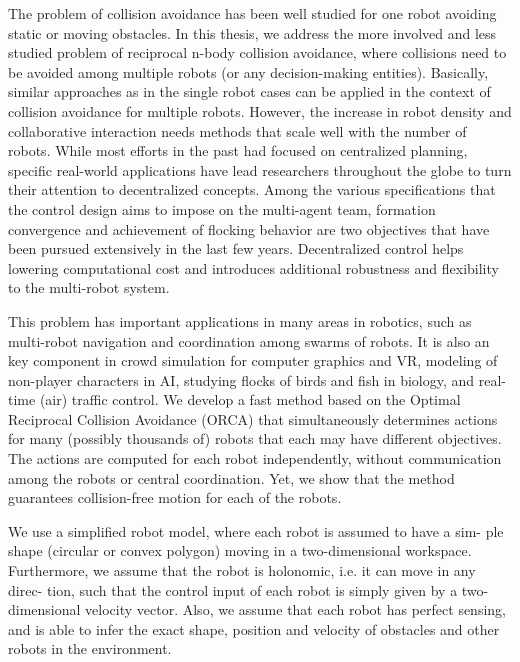 \documentclass[12pt]{report}
\begin{document}
The problem of collision avoidance has been well studied for one robot avoiding static or moving obstacles. In this thesis, we address the more involved and less studied problem of reciprocal n-body collision avoidance, where collisions need to be avoided among multiple robots (or any decision-making entities). Basically, similar approaches as
in the single robot cases can be applied in the context of collision avoidance for multiple robots. However, the increase in robot density and collaborative interaction
needs methods that scale well with the number of robots. While  most  efforts  in  the  past  had  focused  on  centralized  planning, specific real-world applications have  lead researchers throughout the globe to turn their attention to decentralized concepts. Among  the  various  specifications  that  the  control  design  aims  to  impose  on  the  multi-agent  team,  formation convergence and achievement of flocking behavior are two objectives that have been pursued extensively in the last few years. Decentralized control helps lowering computational cost and introduces additional robustness and flexibility to the multi-robot system. 

This problem has important applications in many areas in robotics, such as multi-robot navigation and coordination among swarms of robots. It is also an key component in crowd simulation for computer graphics and VR, modeling of non-player characters in AI, studying flocks of birds and fish in biology, and real-time (air) traffic control. We develop a fast method based on the Optimal Reciprocal Collision Avoidance (ORCA) that simultaneously determines actions for many (possibly thousands of) robots that each may have different objectives. The actions are computed for each robot independently, without communication among the robots or central coordination. Yet, we show that the method guarantees collision-free motion for each of the robots.

We use a simplified robot model, where each robot is assumed to have a sim-
ple shape (circular or convex polygon) moving in a two-dimensional workspace.
Furthermore, we assume that the robot is holonomic, i.e. it can move in any direc-
tion, such that the control input of each robot is simply given by a two-dimensional
velocity vector. Also, we assume that each robot has perfect sensing, and is able
to infer the exact shape, position and velocity of obstacles and other robots in the
environment.
\end{document}

